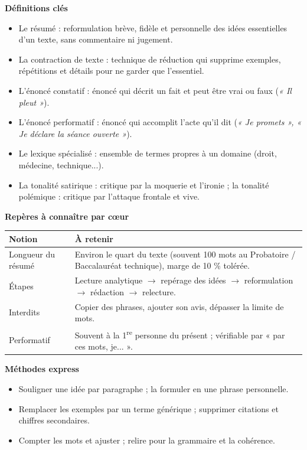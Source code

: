 \documentclass[11pt]{article}
\newcommand{\cle}[1]{{\popxbold\color{popdark}#1}}
\begin{document}
\begin{aretenir}
\textbf{Définitions clés}
\begin{itemize}
\item Le \cle{résumé} : reformulation brève, fidèle et personnelle des idées essentielles d'un texte, sans commentaire ni jugement.
\item La \cle{contraction de texte} : technique de réduction qui supprime exemples, répétitions et détails pour ne garder que l'essentiel.
\item L'\cle{énoncé constatif} : énoncé qui décrit un fait et peut être vrai ou faux (\emph{« Il pleut »}).
\item L'\cle{énoncé performatif} : énoncé qui accomplit l'acte qu'il dit (\emph{« Je promets », « Je déclare la séance ouverte »}).
\item Le \cle{lexique spécialisé} : ensemble de termes propres à un domaine (droit, médecine, technique...).
\item La tonalité \cle{satirique} : critique par la moquerie et l'ironie ; la tonalité \cle{polémique} : critique par l'attaque frontale et vive.
\end{itemize}

\textbf{Repères à connaître par cœur}
\begin{center}
\begin{tabularx}{\linewidth}{|l|X|}
\hline
\rowcolor{popblueL} \textbf{Notion} & \textbf{À retenir} \\
\hline
Longueur du résumé & Environ le quart du texte (souvent 100 mots au Probatoire / Baccalauréat technique), marge de 10 \% tolérée. \\
\hline
Étapes & Lecture analytique $\rightarrow$ repérage des idées $\rightarrow$ reformulation $\rightarrow$ rédaction $\rightarrow$ relecture. \\
\hline
Interdits & Copier des phrases, ajouter son avis, dépasser la limite de mots. \\
\hline
Performatif & Souvent à la 1\textsuperscript{re} personne du présent ; vérifiable par « par ces mots, je... ». \\
\hline
\end{tabularx}
\end{center}

\textbf{Méthodes express}
\begin{itemize}
\item Souligner une idée par paragraphe ; la formuler en une phrase personnelle.
\item Remplacer les exemples par un terme générique ; supprimer citations et chiffres secondaires.
\item Compter les mots et ajuster ; relire pour la grammaire et la cohérence.
\end{itemize}
\end{aretenir}
\end{document}
